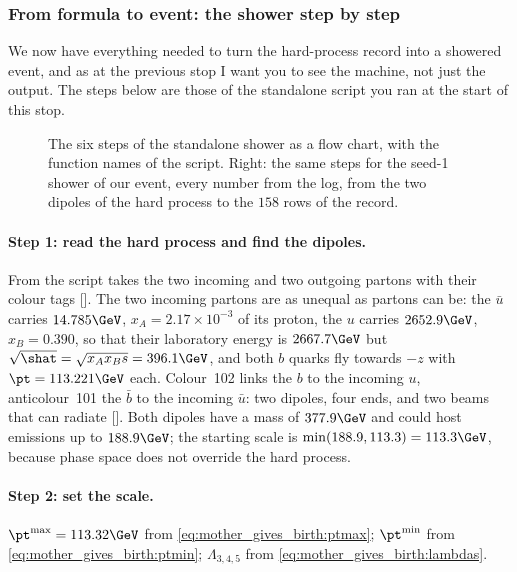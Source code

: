 \subsubsection{From formula to event: the shower step by step}
\label{sec:mother_gives_birth:step_by_step}

We now have everything needed to turn the hard-process record into a
showered event, and as at the previous stop I want you to see the machine,
not just the output. The steps below are those of the standalone script
you ran at the start of this stop.

\begin{figure}[htbp]\centering
\resizebox{\textwidth}{!}{}
\caption[The six steps of the shower, with the numbers of our event]{The six steps of the standalone shower as a flow chart, with the function names of the script. Right: the same steps for the seed-1 shower of our event, every number from the  log, from the two dipoles of the hard process to the $158$ rows of the record.}
\label{fig:mother_gives_birth:shower_flow}
\end{figure}

\paragraph{Step 1: read the hard process and find the dipoles.} From
 the script takes the two incoming and two outgoing
partons with their colour tags []. The two incoming
partons are as unequal as partons can be: the $\bar u$ carries
$14.785\GeV$, $x_A=2.17\times10^{-3}$ of its proton, the $u$ carries
$2652.9\GeV$, $x_B=0.390$, so that their laboratory energy is
$2667.7\GeV$ but $\sqrt{\shat}=\sqrt{x_Ax_Bs}=396.1\GeV$, and both $b$
quarks fly towards $-z$ with $\pt=113.221\GeV$ each. Colour~102 links the $b$
to the incoming $u$, anticolour~101 the $\bar b$ to the incoming $\bar u$:
two dipoles, four ends, and two beams that can radiate
[]. Both dipoles have a mass of $377.9\GeV$ and could
host emissions up to $188.9\GeV$; the starting scale is
$\min(188.9,113.3)=113.3\GeV$, because phase space does not override the
hard process.

\paragraph{Step 2: set the scale.} $\pt^{\max}=113.32\GeV$ from
\cref{eq:mother_gives_birth:ptmax}; $\pt^{\min}$ from
\cref{eq:mother_gives_birth:ptmin}; $\Lambda_{3,4,5}$ from
\cref{eq:mother_gives_birth:lambdas}.

